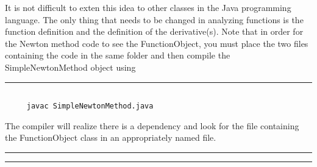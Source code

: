 \documentclass[10pt,fleqn]{article}
\begin{document}
It is not difficult to exten this idea to other classes in the Java programming
language. The only thing that needs to be changed in analyzing functions is the
function definition and the definition of the derivative(s). Note that in order
for the Newton method code to see the FunctionObject, you must place the two
files containing the code in the same folder and then compile the
SimpleNewtonMethod object using
\vskip0.1in\hrule\vskip0.1in
\begin{verbatim}

     javac SimpleNewtonMethod.java

\end{verbatim}
The compiler will realize there is a dependency and look for the file containing
the FunctionObject class in an appropriately named file.
\vskip0.1in\hrule\vskip0.1in
\newpage
\vskip0.1in\hrule\vskip0.1in
\end{document}
